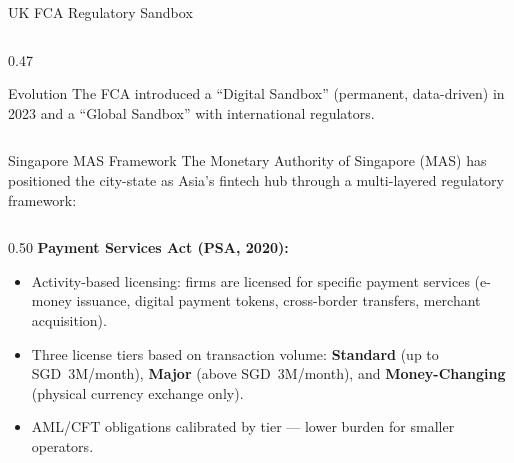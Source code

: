 \begin{frame}{UK FCA Regulatory Sandbox}
\begin{columns}[T]
\begin{column}{0.47\textwidth}
      \vspace{0.3em}
      \begin{block}{Evolution}
        The FCA introduced a ``Digital Sandbox'' (permanent, data-driven) in
        2023 and a ``Global Sandbox'' with international regulators.
      \end{block}
    \end{column}
  \end{columns}
\end{frame}

\begin{frame}{Singapore MAS Framework}
  The Monetary Authority of Singapore (MAS) has positioned the city-state as
  Asia's fintech hub through a multi-layered regulatory framework:

  \vspace{0.5em}
  \begin{columns}[T]
    \begin{column}{0.50\textwidth}
      \textcolor{mlpurple}{\textbf{Payment Services Act (PSA, 2020):}}
      \begin{itemize}
        \item Activity-based licensing: firms are licensed for specific
              payment services (e-money issuance, digital payment tokens,
              cross-border transfers, merchant acquisition).
        \item Three license tiers based on transaction volume:
              \textbf{Standard} (up to SGD~3M/month),
              \textbf{Major} (above SGD~3M/month), and
              \textbf{Money-Changing} (physical currency exchange only).
        \item AML/CFT obligations calibrated by tier --- lower burden for
              smaller operators.
      \end{itemize}


\end{column}
\end{columns}
\end{frame}
